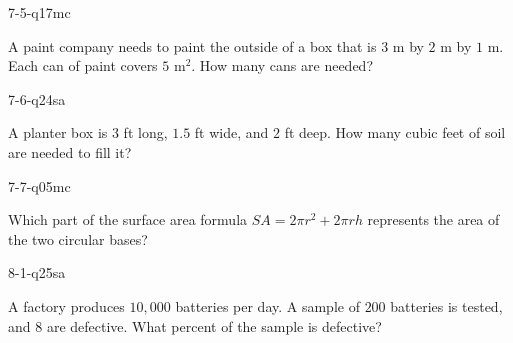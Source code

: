 \begin{practiceQuestion}{7-5-q17}{mc}
\begin{questionText}
A paint company needs to paint the outside of a box that is $3$ m by $2$ m by $1$ m. Each can of paint covers $5$ m$^2$. How many cans are needed?
\end{questionText}
\end{practiceQuestion}

\begin{practiceQuestion}{7-6-q24}{sa}
\begin{questionText}
A planter box is $3$ ft long, $1.5$ ft wide, and $2$ ft deep. How many cubic feet of soil are needed to fill it?
\end{questionText}
\end{practiceQuestion}

\begin{practiceQuestion}{7-7-q05}{mc}
\begin{questionText}
Which part of the surface area formula $SA = 2\pi r^2 + 2\pi rh$ represents the area of the two circular bases?
\end{questionText}
\end{practiceQuestion}

\begin{practiceQuestion}{8-1-q25}{sa}
\begin{questionText}
A factory produces $10{,}000$ batteries per day. A sample of $200$ batteries is tested, and $8$ are defective. What percent of the sample is defective?
\end{questionText}
\end{practiceQuestion}

